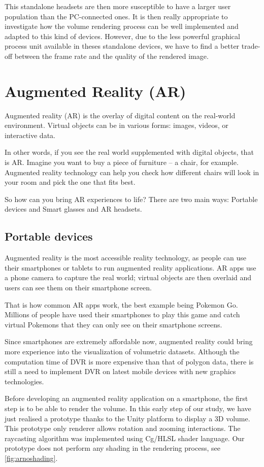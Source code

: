 This standalone headsets are then more susceptible to have a larger user population than the PC-connected ones. It is then really appropriate to investigate how the volume rendering process can be well implemented and adapted to this kind of devices. However, due to the less powerful graphical process unit available in theses standalone devices, we have to find a better trade-off between the frame rate and the quality of the rendered image. 


\section{ Augmented Reality (AR)}

Augmented reality (AR) is the overlay of digital content on the real-world environment. Virtual objects can be in various forms: images, videos, or interactive data.


In other words, if you see the real world supplemented with digital objects, that is AR. Imagine you want to buy a piece of furniture – a chair, for example. Augmented reality technology can help you check how different chairs will look in your room and pick the one that fits best.


So how can you bring AR experiences to life? There are two main ways: Portable devices and Smart glasses and AR headsets. 


\subsection{Portable devices}

Augmented reality is the most accessible reality technology, as people can use their smartphones or tablets to run augmented reality applications. AR apps use a phone camera to capture the real world; virtual objects are then overlaid and users can see them on their smartphone screen.


That is how common AR apps work, the best example being Pokemon Go. Millions of people have used their smartphones to play this game and catch virtual Pokemons that they can only see on their smartphone screens. 


Since smartphones are extremely affordable now, augmented reality could bring more experience into the visualization of volumetric datasets. Although the computation time
of DVR is more expensive than that of polygon data, there is
still a need to implement DVR on latest mobile devices with
new graphics technologies.


Before developing an augmented reality application on a smartphone, the first step is to be able to render the volume. In this early step of our study, we have just realised a prototype thanks to the Unity platform to display a 3D volume. This prototype only renderer allows  rotation and zooming interactions. The raycasting algorithm was implemented using Cg/HLSL shader language. Our prototype does not  perform any shading in the rendering process, see \autoref{fig:arnoshading}. 

